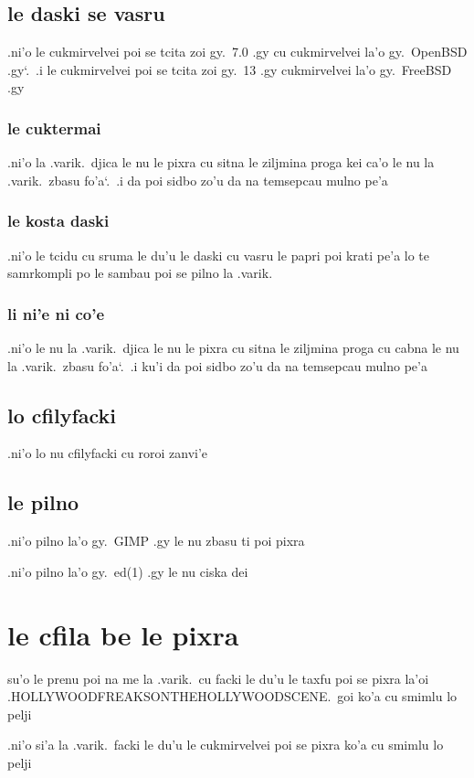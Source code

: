 \documentclass{report}
\newcommand\sds{\spacefactor\sfcode`.\ \space}
\begin{document}
\subsection{le daski se vasru}
.ni'o le cukmirvelvei poi se tcita zoi gy.\ 7.0 .gy cu cukmirvelvei la'o gy.\ OpenBSD .gy\sds  .i le cukmirvelvei poi se tcita zoi gy.\ 13 .gy cukmirvelvei la'o gy.\ FreeBSD .gy

\subsubsection{le cuktermai}
.ni'o la .varik.\ djica le nu le pixra cu sitna le ziljmina proga kei ca'o le nu la .varik.\ zbasu fo'a\sds  .i da poi sidbo zo'u da na temsepcau mulno pe'a

\subsubsection{le kosta daski}
.ni'o le tcidu cu sruma le du'u le daski cu vasru le papri poi krati pe'a lo te samrkompli po le sambau poi se pilno la .varik.

\subsubsection{li ni'e ni co'e}
.ni'o le nu la .varik.\ djica le nu le pixra cu sitna le ziljmina proga cu cabna le nu la .varik.\ zbasu fo'a\sds  .i ku'i da poi sidbo zo'u da na temsepcau mulno pe'a

\subsection{lo cfilyfacki}
.ni'o lo nu cfilyfacki cu roroi zanvi'e

\subsection{le pilno}
.ni'o pilno la'o gy.\ GIMP .gy le nu zbasu ti poi pixra

.ni'o pilno la'o gy.\ ed(1) .gy le nu ciska dei

\section{le cfila be le pixra}
su'o le prenu poi na me la .varik.\ cu facki le du'u le taxfu poi se pixra la'oi .HOLLYWOODFREAKSONTHEHOLLYWOODSCENE.\ goi ko'a cu smimlu lo pelji

.ni'o si'a la .varik.\ facki le du'u le cukmirvelvei poi se pixra ko'a cu smimlu lo pelji
\end{document}
